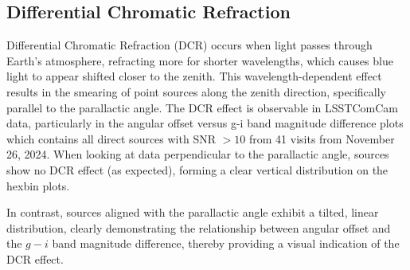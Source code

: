 \subsection{Differential Chromatic Refraction}
\label{sec:differential_chromatic_refraction}
\gls{Differential Chromatic Refraction} (DCR) occurs when light passes through Earth’s atmosphere, refracting more for shorter wavelengths, which causes blue light to appear shifted closer to the zenith. This wavelength-dependent effect results in the smearing of point sources along the zenith direction, specifically parallel to the parallactic angle. The DCR effect is observable in LSSTComCam data, particularly in the angular offset versus g-i band magnitude difference plots  which contains all direct sources with \gls{SNR} $>10$ from 41 visits from November 26, 2024. When looking at data perpendicular to the parallactic angle, sources show no DCR effect (as expected), forming a clear vertical distribution on the hexbin plots.

In contrast, sources aligned with the parallactic angle exhibit a tilted, linear distribution, clearly demonstrating the relationship between angular offset and the $g-i$ band magnitude difference, thereby providing a visual indication of the \gls{DCR} effect.


